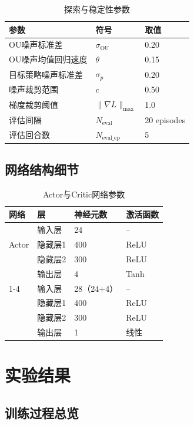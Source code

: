 \documentclass[UTF8,a4paper,12pt]{ctexart}
\begin{document}
\begin{table}[H]
\centering
\caption{探索与稳定性参数}
\label{tab:noise_params}
\begin{tabular}{lll}
\toprule
\textbf{参数} & \textbf{符号} & \textbf{取值} \\
\midrule
OU噪声标准差 & $\sigma_{\text{OU}}$ & 0.20 \\
OU噪声均值回归速度 & $\theta$ & 0.15 \\
目标策略噪声标准差 & $\sigma_p$ & 0.20 \\
噪声裁剪范围 & $c$ & 0.50 \\
梯度裁剪阈值 & $\|\nabla L\|_{\max}$ & 1.0 \\
评估间隔 & $N_{\text{eval}}$ & 20 episodes \\
评估回合数 & $N_{\text{eval\_ep}}$ & 5 \\
\bottomrule
\end{tabular}
\end{table}

\subsection{网络结构细节}

\begin{table}[H]
\centering
\caption{Actor与Critic网络参数}
\label{tab:network}
\begin{tabular}{llll}
\toprule
\textbf{网络} & \textbf{层} & \textbf{神经元数} & \textbf{激活函数} \\
\midrule
\multirow{3}{*}{Actor} & 输入层 & 24 & -- \\
 & 隐藏层1 & 400 & ReLU \\
 & 隐藏层2 & 300 & ReLU \\
 & 输出层 & 4 & Tanh \\
\cmidrule{1-4}
\multirow{3}{*}{Critic} & 输入层 & 28（24+4） & -- \\
 & 隐藏层1 & 400 & ReLU \\
 & 隐藏层2 & 300 & ReLU \\
 & 输出层 & 1 & 线性 \\
\bottomrule
\end{tabular}
\end{table}

\section{实验结果}

\subsection{训练过程总览}
\end{document}

